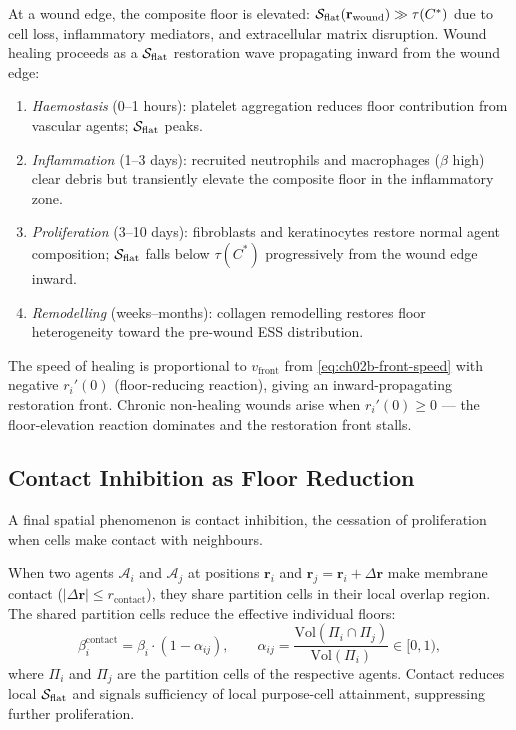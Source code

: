 \begin{example}
\label{ex:ch02b-wound-healing}
At a wound edge, the composite floor is elevated:
$\mathcal{S}_{\mathrm{flat}}(\mathbf{r}_{\mathrm{wound}}) \gg \tau(C^*)$ due to
cell loss, inflammatory mediators, and extracellular matrix disruption.
Wound healing proceeds as a $\mathcal{S}_{\mathrm{flat}}$ restoration wave
propagating inward from the wound edge:
\begin{enumerate}[leftmargin=2em]
  \item \emph{Haemostasis} (0--1 hours): platelet aggregation reduces floor
    contribution from vascular agents; $\mathcal{S}_{\mathrm{flat}}$ peaks.
  \item \emph{Inflammation} (1--3 days): recruited neutrophils and macrophages
    ($\beta$ high) clear debris but transiently elevate the composite floor
    in the inflammatory zone.
  \item \emph{Proliferation} (3--10 days): fibroblasts and keratinocytes
    restore normal agent composition; $\mathcal{S}_{\mathrm{flat}}$ falls below
    $\tau(C^*)$ progressively from the wound edge inward.
  \item \emph{Remodelling} (weeks--months): collagen remodelling restores
    floor heterogeneity toward the pre-wound ESS distribution.
\end{enumerate}
The speed of healing is proportional to $v_{\mathrm{front}}$ from
\eqref{eq:ch02b-front-speed} with negative $r_i'(0)$ (floor-reducing reaction),
giving an inward-propagating restoration front.  Chronic non-healing wounds
arise when $r_i'(0) \geq 0$ — the floor-elevation reaction dominates and the
restoration front stalls.
\end{example}

\subsection{Contact Inhibition as Floor Reduction}

A final spatial phenomenon is contact inhibition, the cessation of
proliferation when cells make contact with neighbours.

\begin{proposition}
\label{prop:ch02b-contact-inhibition}
When two agents $\mathcal{A}_i$ and $\mathcal{A}_j$ at positions
$\mathbf{r}_i$ and $\mathbf{r}_j = \mathbf{r}_i + \Delta\mathbf{r}$ make
membrane contact ($|\Delta\mathbf{r}| \leq r_{\mathrm{contact}}$), they share
partition cells in their local overlap region.  The shared partition cells
reduce the effective individual floors:
\begin{equation}
  \beta_i^{\mathrm{contact}} = \beta_i \cdot (1 - \alpha_{ij}),
  \qquad
  \alpha_{ij} = \frac{\mathrm{Vol}(\Pi_i \cap \Pi_j)}{\mathrm{Vol}(\Pi_i)} \in [0,1),
  \label{eq:ch02b-contact-inhibition}
\end{equation}
where $\Pi_i$ and $\Pi_j$ are the partition cells of the respective agents.
Contact reduces local $\mathcal{S}_{\mathrm{flat}}$ and signals sufficiency of
local purpose-cell attainment, suppressing further proliferation.
\end{proposition}

